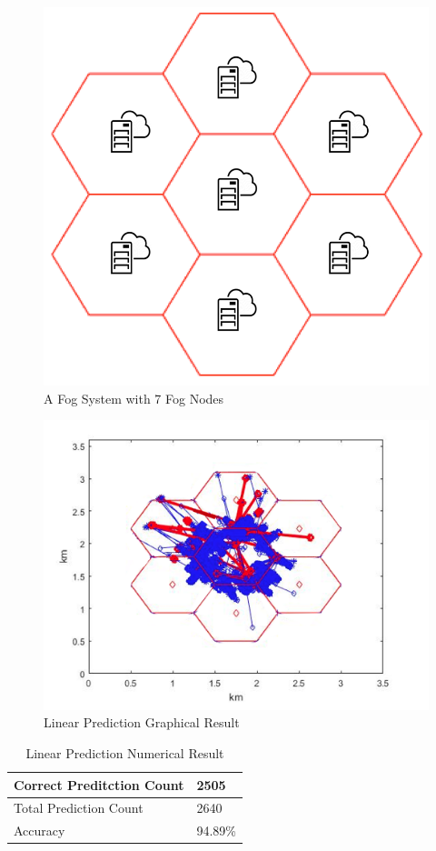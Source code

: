 \begin{figure}[ht!]
\centering
\includegraphics[width=0.5\linewidth]{images/car_7}
\caption{A Fog System with 7 Fog Nodes}
\label{car7}
\end{figure}


\begin{figure}[ht!]
\centering
\includegraphics[width=1\linewidth]{images/car_res}
\caption{Linear Prediction Graphical Result}
\label{RomeRes}
\end{figure}


\begin{table}[h]
\caption{Linear Prediction Numerical Result}
\centering
\begin{tabular}{|m{4cm}|m{2cm}|}
	\hline
	Correct Preditction Count & 2505 \\ 
	\hline
	Total Prediction Count & 2640 \\ 
	\hline
	Accuracy & 94.89\% \\ \hline
\end{tabular}
\label{cartable}
\end{table}




\fi














